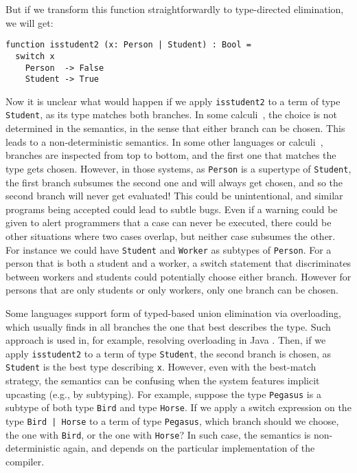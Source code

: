 But if we transform this function straightforwardly to type-directed
elimination, we will get:

\begin{lstlisting}
function isstudent2 (x: Person | Student) : Bool =
  switch x
    Person  -> False
    Student -> True
\end{lstlisting}

\noindent Now it is unclear what would happen if we apply \lstinline{isstudent2}
to a term of type \lstinline{Student}, as its type matches both branches. In
some calculi~\citep{dunfield2014elaborating}, the choice is not determined in
the semantics, in the sense that either branch can be chosen. This leads to a
non-deterministic semantics. In some other languages or
calculi~\citep{castagna:settheoretic}, branches are inspected from top to
bottom, and the first one that matches the type gets chosen. However, in those
systems, as \lstinline{Person} is a supertype of \lstinline{Student}, the first
branch subsumes the second one and will always get chosen, and so the second
branch will never get evaluated! This could be unintentional, and similar
programs being accepted could lead to subtle bugs. Even if a warning could be
given to alert programmers that a case can never be executed, there could be
other situations where two cases overlap, but neither case subsumes the other.
For instance we could have \lstinline{Student} and \lstinline{Worker} as
subtypes of \lstinline{Person}. For a person that is both a student and a
worker, a switch statement that discriminates between workers and students could
potentially choose either branch. However for persons that are only students or
only workers, only one branch can be chosen.

Some languages support form of typed-based union elimination via overloading,
which usually finds in all branches the one that best describes the type. Such
approach is used in, for example, resolving overloading in Java \cite{javadoc}.
Then, if we apply \lstinline{isstudent2} to a term of type \lstinline{Student},
the second branch is chosen, as \lstinline{Student} is the best type describing
\lstinline{x}. However, even with the best-match strategy, the semantics can be
confusing when the system features implicit upcasting (e.g., by subtyping). For
example, suppose the type \lstinline{Pegasus} is a subtype of both type
\lstinline{Bird} and type \lstinline{Horse}. If we apply a switch expression on
the type \lstinline{Bird | Horse} to a term of type \lstinline{Pegasus}, which
branch should we choose, the one with \lstinline{Bird}, or the one with
\lstinline{Horse}? In such case, the semantics is non-deterministic again, and
depends on the particular implementation of the compiler.


